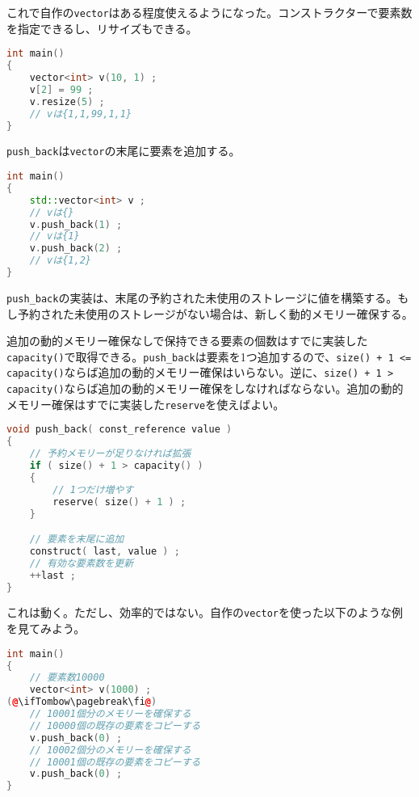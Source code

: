 これで自作の\texttt{vector}はある程度使えるようになった。コンストラクターで要素数を指定できるし、リサイズもできる。

\begin{lstlisting}[language={C++}]
int main()
{
    vector<int> v(10, 1) ;
    v[2] = 99 ;
    v.resize(5) ;
    // vは{1,1,99,1,1}
}
\end{lstlisting}


\texttt{push\_back}は\texttt{vector}の末尾に要素を追加する。

\begin{lstlisting}[language={C++}]
int main()
{
    std::vector<int> v ;
    // vは{}
    v.push_back(1) ;
    // vは{1}
    v.push_back(2) ;
    // vは{1,2}
}
\end{lstlisting}

\texttt{push\_back}の実装は、末尾の予約された未使用のストレージに値を構築する。もし予約された未使用のストレージがない場合は、新しく動的メモリー確保する。

追加の動的メモリー確保なしで保持できる要素の個数はすでに実装した\texttt{capacity()}で取得できる。\texttt{push\_back}は要素を1つ追加するので、\texttt{size() + 1 <= capacity()}ならば追加の動的メモリー確保はいらない。逆に、\texttt{size() + 1 > capacity()}ならば追加の動的メモリー確保をしなければならない。追加の動的メモリー確保はすでに実装した\texttt{reserve}を使えばよい。

\begin{lstlisting}[language={C++}]
void push_back( const_reference value ) 
{
    // 予約メモリーが足りなければ拡張
    if ( size() + 1 > capacity() )
    {
        // 1つだけ増やす
        reserve( size() + 1 ) ;
    }

    // 要素を末尾に追加
    construct( last, value ) ;
    // 有効な要素数を更新
    ++last ;
}
\end{lstlisting}

これは動く。ただし、効率的ではない。自作の\texttt{vector}を使った以下のような例を見てみよう。

\begin{lstlisting}[language={C++}]
int main()
{
    // 要素数10000
    vector<int> v(1000) ;
(@\ifTombow\pagebreak\fi@)
    // 10001個分のメモリーを確保する
    // 10000個の既存の要素をコピーする
    v.push_back(0) ;
    // 10002個分のメモリーを確保する
    // 10001個の既存の要素をコピーする
    v.push_back(0) ;
}
\end{lstlisting}

